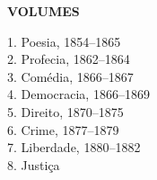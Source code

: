 \begingroup\footnotesize\parindent0pt\vspace*{3em}

\thispagestyle{empty}
{\formular\bfseries VOLUMES}\smallskip

1. Poesia, 1854–1865\\
2. Profecia, 1862–1864\\
3. Comédia, 1866–1867\\
4. Democracia, 1866–1869\\
5. Direito, 1870–1875\\
6. Crime, 1877–1879\\
7. Liberdade, 1880–1882\\
8. Justiça	

\endgroup
\pagebreak